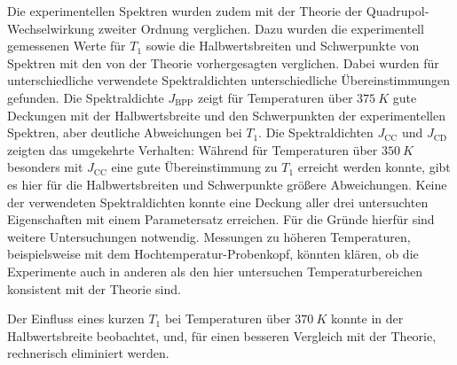 Die experimentellen Spektren wurden zudem mit der Theorie der Quadrupol-Wech\-sel\-wir\-kung zweiter Ordnung verglichen. Dazu wurden die experimentell gemessenen Werte für $T_1$ sowie die Halbwertsbreiten und Schwerpunkte von Spektren mit den von der Theorie vorhergesagten verglichen. Dabei wurden für unterschiedliche verwendete Spektraldichten unterschiedliche Übereinstimmungen gefunden. Die Spektraldichte $J_\text{BPP}$ zeigt für Temperaturen über $\SI{375}{K}$ gute Deckungen mit der Halbwertsbreite und den Schwerpunkten der experimentellen Spektren, aber deutliche Abweichungen bei $T_1$. Die Spektraldichten $J_\text{CC}$ und $J_\text{CD}$ zeigten das umgekehrte Verhalten: Während für Temperaturen über $\SI{350}{K}$ besonders mit $J_\text{CC}$ eine gute Übereinstimmung zu $T_1$ erreicht werden konnte, gibt es hier für die Halbwertsbreiten und Schwerpunkte größere Abweichungen. Keine der verwendeten Spektraldichten konnte eine Deckung aller drei untersuchten Eigenschaften mit einem Parametersatz erreichen. Für die Gründe hierfür sind weitere Untersuchungen notwendig. Messungen zu höheren Temperaturen, beispielsweise mit dem Hochtemperatur-Probenkopf, könnten klären, ob die Experimente auch in anderen als den hier untersuchen Temperaturbereichen konsistent mit der Theorie sind.

Der Einfluss eines kurzen $T_1$ bei Temperaturen über $\SI{370}{K}$ konnte in der Halbwertsbreite beobachtet, und, für einen besseren Vergleich mit der Theorie, rechnerisch eliminiert werden.

